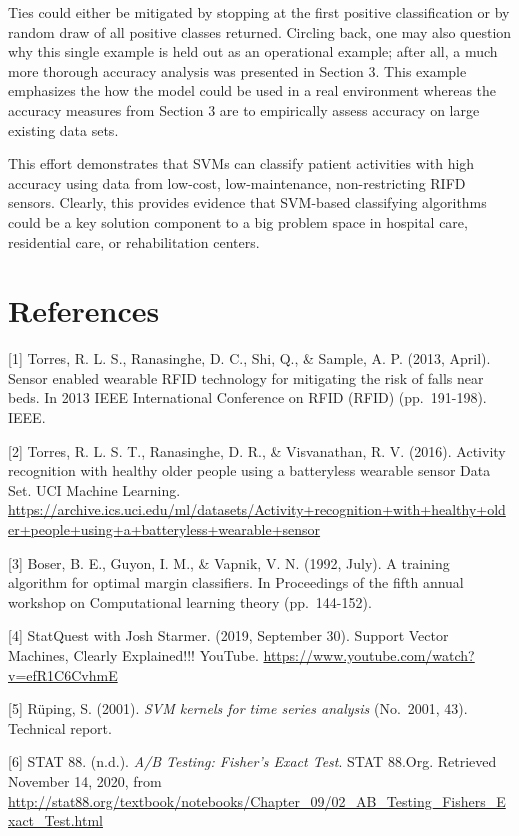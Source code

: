 \documentclass[
]{article}
\begin{document}
Ties could either be mitigated by stopping at the first positive
classification or by random draw of all positive classes returned.
Circling back, one may also question why this single example is held out
as an operational example; after all, a much more thorough accuracy
analysis was presented in Section 3. This example emphasizes the how the
model could be used in a real environment whereas the accuracy measures
from Section 3 are to empirically assess accuracy on large existing data
sets.

This effort demonstrates that SVMs can classify patient activities with
high accuracy using data from low-cost, low-maintenance, non-restricting
RIFD sensors. Clearly, this provides evidence that SVM-based classifying
algorithms could be a key solution component to a big problem space in
hospital care, residential care, or rehabilitation centers.

\newpage

\section{References}\label{references}

{[}1{]} Torres, R. L. S., Ranasinghe, D. C., Shi, Q., \& Sample, A. P.
(2013, April). Sensor enabled wearable RFID technology for mitigating
the risk of falls near beds. In 2013 IEEE International Conference on
RFID (RFID) (pp.~191-198). IEEE.

{[}2{]} Torres, R. L. S. T., Ranasinghe, D. R., \& Visvanathan, R. V.
(2016). Activity recognition with healthy older people using a
batteryless wearable sensor Data Set. UCI Machine Learning.
\url{https://archive.ics.uci.edu/ml/datasets/Activity+recognition+with+healthy+older+people+using+a+batteryless+wearable+sensor}

{[}3{]} Boser, B. E., Guyon, I. M., \& Vapnik, V. N. (1992, July). A
training algorithm for optimal margin classifiers. In Proceedings of the
fifth annual workshop on Computational learning theory (pp.~144-152).

{[}4{]} StatQuest with Josh Starmer. (2019, September 30). Support
Vector Machines, Clearly Explained!!! YouTube.
\url{https://www.youtube.com/watch?v=efR1C6CvhmE}

{[}5{]} Rüping, S. (2001). \emph{SVM kernels for time series analysis}
(No.~2001, 43). Technical report.

{[}6{]} STAT 88. (n.d.). \emph{A/B Testing: Fisher's Exact Test}. STAT
88.Org. Retrieved November 14, 2020, from
\url{http://stat88.org/textbook/notebooks/Chapter_09/02_AB_Testing_Fishers_Exact_Test.html}
\end{document}
